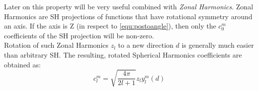 \documentclass[thesis.tex]{subfiles}
\begin{document}
Later on this property will be very useful combined with \emph{Zonal Harmonics}.
Zonal Harmonics are SH projections of functions that have rotational symmetry around an axis.
If the axis is Z (in respect to \autoref{equ:postoangle}), then only the $c^m_0$ coefficients of the SH projection will be non-zero.\\
Rotation of such Zonal Harmonics $z_l$ to a new direction $d$ is generally much easier than arbitrary SH.
The resulting, rotated Spherical Harmonics coefficients are obtained as:
\begin{equation} \label{eq:zonalrotate}
	c_l^m = \sqrt{\frac{4\pi}{2l+1}} z_l y_l^m(d)
\end{equation}

\subfilebib %
\end{document}
